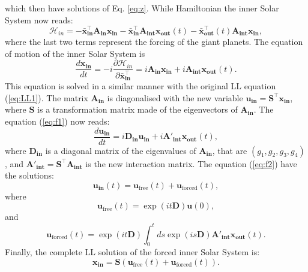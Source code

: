 \documentclass[12pt]{article}
\begin{document}
	which then have solutions of Eq. \ref{eq:z}. While Hamiltonian the inner Solar System now reads:
	\begin{equation}
	\mathcal{H}_{in} = - \boldsymbol{\bar{x}_{in}^\top} \mathbf{A_{in}} \boldsymbol{x_{in}} - \boldsymbol{\bar{x}_{in}^\top} \mathbf{A_{int}} \boldsymbol{x_{out}} (t)  - \boldsymbol{\bar{x}_{out}^\top}(t) \mathbf{A_{int}} \boldsymbol{x_{in}},
	\end{equation}
	where the last two terms represent the forcing of the giant planets. The equation of motion of the inner Solar System is
	\begin{equation} \label{eq:f1}
	\frac{d \boldsymbol{x_{in}}}{dt} = -i \frac{\partial \mathcal{H}_{in}}{\partial \boldsymbol{\bar{x}_{in}^\top }}= i \mathbf{A_{in}} \boldsymbol{x_{in}} + i\mathbf{A_{int}} \boldsymbol{x_{out}} (t).
	\end{equation}
	This equation is solved in a similar manner with the original LL equation (\ref{eq:LL1}). The matrix $\mathbf{A_{in}}$ is diagonalised with the new variable $\boldsymbol{u_{in}} = \mathbf{S}^{\top} \boldsymbol{x_{in}}$, where $\mathbf{S}$ is a transformation matrix made of the eigenvectors of $\mathbf{A_{in}}$. The equation (\ref{eq:f1}) now reads:
	\begin{equation} \label{eq:f2}
	\frac{d \boldsymbol{u_{in}}}{dt} = i \mathbf{D_{in}} \boldsymbol{u_{in}} + i\mathbf{A'_{int}} \boldsymbol{x_{out}} (t),
	\end{equation}
	where $\mathbf{D_{in}}$ is a diagonal matrix of the eigenvalues of $\mathbf{A_{in}}$, that are $(g_1, g_2, g_3, g_4)$, and $\mathbf{A'_{int}} = \mathbf{S}^\top \mathbf{A_{int}}$ is the new interaction matrix.
	The equation (\ref{eq:f2})    have the solutions:
	\begin{equation}
	\boldsymbol{u_{in}}(t) = \boldsymbol{u}_{\text{free}}(t) + \boldsymbol{u}_{\text{forced}} (t),
	\end{equation}
	where 
	\begin{equation}
	\boldsymbol{u}_{\text{free}}(t) = \exp(it\mathbf{D}) \boldsymbol{u}(0),
	\end{equation}
	and
	\begin{equation} \label{eq:u_forced}
	\boldsymbol{u}_{\text{forced}}(t) = \exp(it\mathbf{D})\int_{0}^{t} ds \exp(is\mathbf{D})\mathbf{A'_{int}} \boldsymbol{x_{out}} (t).
	\end{equation}
	Finally, the complete LL solution of the forced inner Solar System is:
	\begin{equation} \label{eq:sol_FLL}
	\boldsymbol{x_{in}} = \mathbf{S} ( \boldsymbol{u}_{\text{free}}(t) + \boldsymbol{u}_{\text{forced}} (t)).
	\end{equation}
\end{document}
